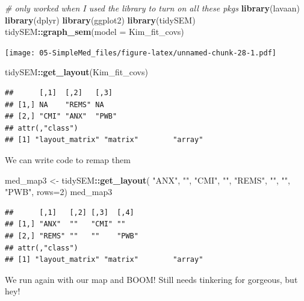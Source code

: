 \documentclass[
  11pt,
]{book}
\newenvironment{Shaded}{\begin{snugshade}}{\end{snugshade}}
\newcommand{\AttributeTok}[1]{\textcolor[rgb]{0.27,0.27,0.27}{#1}}
\newcommand{\CommentTok}[1]{\textcolor[rgb]{0.37,0.37,0.37}{\textit{#1}}}
\newcommand{\DecValTok}[1]{\textcolor[rgb]{0.06,0.06,0.06}{#1}}
\newcommand{\FunctionTok}[1]{\textcolor[rgb]{0.27,0.27,0.27}{\textbf{#1}}}
\newcommand{\NormalTok}[1]{#1}
\newcommand{\OtherTok}[1]{\textcolor[rgb]{0.37,0.37,0.37}{#1}}
\newcommand{\SpecialCharTok}[1]{\textcolor[rgb]{0.43,0.43,0.43}{\textbf{#1}}}
\newcommand{\StringTok}[1]{\textcolor[rgb]{0.5,0.5,0.5}{#1}}
\begin{document}
\begin{Shaded}
\begin{Highlighting}[]
\CommentTok{\# only worked when I used the library to turn on all these pkgs}
\FunctionTok{library}\NormalTok{(lavaan)}
\FunctionTok{library}\NormalTok{(dplyr)}
\FunctionTok{library}\NormalTok{(ggplot2)}
\FunctionTok{library}\NormalTok{(tidySEM)}
\NormalTok{tidySEM}\SpecialCharTok{::}\FunctionTok{graph\_sem}\NormalTok{(}\AttributeTok{model =}\NormalTok{ Kim\_fit\_covs)}
\end{Highlighting}
\end{Shaded}

\texttt{[image: 05-SimpleMed\_files/figure-latex/unnamed-chunk-28-1.pdf]}

\begin{Shaded}
\begin{Highlighting}[]
\NormalTok{tidySEM}\SpecialCharTok{::}\FunctionTok{get\_layout}\NormalTok{(Kim\_fit\_covs)}
\end{Highlighting}
\end{Shaded}

\begin{verbatim}
##      [,1]  [,2]   [,3] 
## [1,] NA    "REMS" NA   
## [2,] "CMI" "ANX"  "PWB"
## attr(,"class")
## [1] "layout_matrix" "matrix"        "array"
\end{verbatim}

We can write code to remap them

\begin{Shaded}
\begin{Highlighting}[]
\NormalTok{med\_map3 }\OtherTok{\textless{}{-}}\NormalTok{ tidySEM}\SpecialCharTok{::}\FunctionTok{get\_layout}\NormalTok{(}
                                \StringTok{"ANX"}\NormalTok{, }\StringTok{""}\NormalTok{,   }\StringTok{"CMI"}\NormalTok{,  }\StringTok{""}\NormalTok{,}
                               \StringTok{"REMS"}\NormalTok{, }\StringTok{""}\NormalTok{,  }\StringTok{""}\NormalTok{,    }\StringTok{"PWB"}\NormalTok{, }\AttributeTok{rows=}\DecValTok{2}\NormalTok{)}
\NormalTok{med\_map3}
\end{Highlighting}
\end{Shaded}

\begin{verbatim}
##      [,1]   [,2] [,3]  [,4] 
## [1,] "ANX"  ""   "CMI" ""   
## [2,] "REMS" ""   ""    "PWB"
## attr(,"class")
## [1] "layout_matrix" "matrix"        "array"
\end{verbatim}

We run again with our map and BOOM! Still needs tinkering for gorgeous, but hey!
\end{document}
